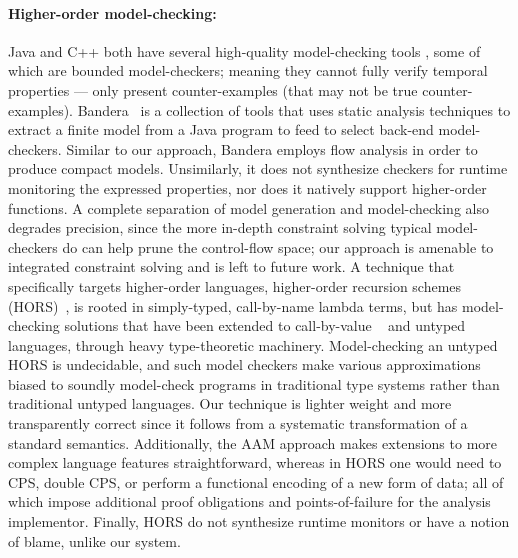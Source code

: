 \paragraph{Higher-order model-checking:}
Java and C++ both have several high-quality model-checking tools \citep{ianjohnson:bandera, ianjohnson:java-pathfinder, ianjohnson:LLBMC}, some of which are bounded model-checkers; meaning they cannot fully verify temporal properties --- only present counter-examples (that may not be true counter-examples).
%
Bandera~\citep{ianjohnson:bandera} is a collection of tools that uses static analysis techniques to extract a finite model from a Java program to feed to select back-end model-checkers.
%
Similar to our approach, Bandera employs flow analysis in order to produce compact models.
%
Unsimilarly, it does not synthesize checkers for runtime monitoring the expressed properties, nor does it natively support higher-order functions.
%
A complete separation of model generation and model-checking also degrades precision, since the more in-depth constraint solving typical model-checkers do can help prune the control-flow space; our approach is amenable to integrated constraint solving and is left to future work.
%
A technique that specifically targets higher-order languages, higher-order recursion schemes (HORS)~\citep{ianjohnson:Knapik:2002:HPT:646794.704852}, is rooted in simply-typed, call-by-name lambda terms, but has model-checking solutions that have been extended to call-by-value ~\citep{ianjohnson:DBLP:journals/jacm/Kobayashi13} and untyped ~\citep{dvanhorn:Tsukada2010Untyped} languages, through heavy type-theoretic machinery.
%
Model-checking an untyped HORS is undecidable, and such model checkers make various approximations biased to soundly model-check programs in traditional type systems rather than traditional untyped languages.
%
Our technique is lighter weight and more transparently correct since it follows from a systematic transformation of a standard semantics.
%
Additionally, the AAM approach makes extensions to more complex language features straightforward, whereas in HORS one would need to CPS, double CPS, or perform a functional encoding of a new form of data; all of which impose additional proof obligations and points-of-failure for the analysis implementor.
%
Finally, HORS do not synthesize runtime monitors or have a notion of blame, unlike our system.
%
